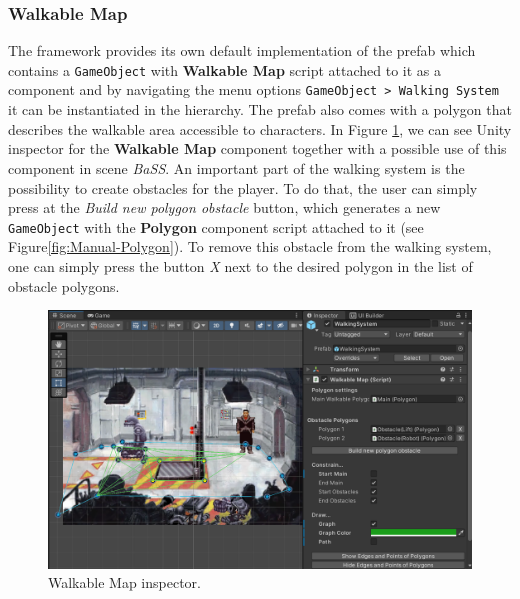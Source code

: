\subsubsection{Walkable Map}
The framework provides its own default implementation of the prefab which contains a \verb|GameObject| with \textbf{Walkable Map} script attached to it as a component and by navigating the menu options \verb|GameObject > Walking System| it can be instantiated in the hierarchy. The prefab also comes with a polygon that describes the walkable area accessible to characters. In Figure \ref{fig:Manual-WM}, we can see Unity inspector for the \textbf{Walkable Map} component together with a possible use of this component in scene \textit{BaSS}. An important part of the walking system is the possibility to create obstacles for the player. To do that, the user can simply press at the \textit{Build new polygon obstacle} button, which generates a new \verb|GameObject| with the \textbf{Polygon} component script attached to it (see Figure\ref{fig:Manual-Polygon}). To remove this obstacle from the walking system, one can simply press the button \textit{X} next to the desired polygon in the list of obstacle polygons. 

\begin{figure}[H]
\centering
\includegraphics[width=1\linewidth]{img/User doc/walkable_map.png}
\caption{Walkable Map inspector.}
\label{fig:Manual-WM}
\end{figure}

